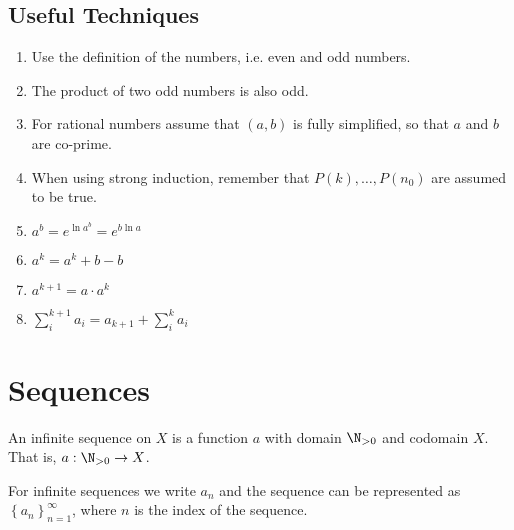\documentclass{article}
\begin{document}
\subsection{Useful Techniques}
\nopagebreak
\begin{multicols}{2}
    \begin{enumerate}
        \item Use the definition of the numbers, i.e. even and odd numbers.
        \item The product of two odd numbers is also odd.
        \item For rational numbers assume that $(a,b)$ is fully simplified, so that $a$ and $b$ are co-prime.
        \item When using strong induction, remember that $P(k), \ldots, P(n_0)$ are assumed to be true.
              \columnbreak
        \item $a^b=e^{\ln{a^b}}=e^{b\ln{a}}$
        \item $a^k = a^k + b - b$
        \item $a^{k+1} = a \cdot a^k$
        \item $\sum_{i}^{k+1} a_i = a_{k+1} + \sum_{i}^{k} a_i$
    \end{enumerate}
\end{multicols}
%
\section{Sequences}
An infinite sequence on $X$ is a function $a$ with domain $\N_{> 0}$ and codomain $X$. That is, $a:\N_{> 0}\to X$.

For infinite sequences we write $a_n$ and the sequence can be represented as $\left\{a_n\right\}_{n=1}^\infty$, where $n$ is the index of the sequence.
%
\end{document}
